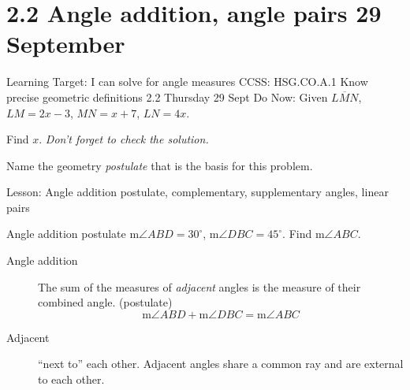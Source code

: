 \section{2.2 Angle addition, angle pairs \hfill 29 September}
\begin{frame}{Learning Target: I can solve for angle measures}
  {CCSS: HSG.CO.A.1 Know precise geometric definitions \hfill \alert{2.2 Thursday 29 Sept}}
    Do Now: Given $\overline{LMN}$, $LM=2x-3$, $MN=x+7$, $LN=4x$. \par  
    Find $x$. \hfill \emph{Don't forget to check the solution.} \medskip 
      \begin{flushleft}
      \end{flushleft}
      \vspace{2cm}
    Name the geometry \emph{postulate} that is the basis for this problem. \par \medskip 
    Lesson: Angle addition postulate, complementary, supplementary angles, linear pairs
  \end{frame}

\begin{frame}{Angle addition postulate}
  m$\angle ABD=30^\circ$, m$\angle DBC=45^\circ$. Find m$\angle ABC$. \par \bigskip
     \bigskip
    \begin{description}
      \item[Angle addition] The sum of the measures of \emph{adjacent} angles is the measure of their combined angle. (postulate)
      $$\text{m}\angle ABD + \text{m}\angle DBC = \text{m}\angle ABC$$
      \item[Adjacent] ``next to'' each other. Adjacent angles share a common ray and are external to each other.
    \end{description}
  \end{frame}

